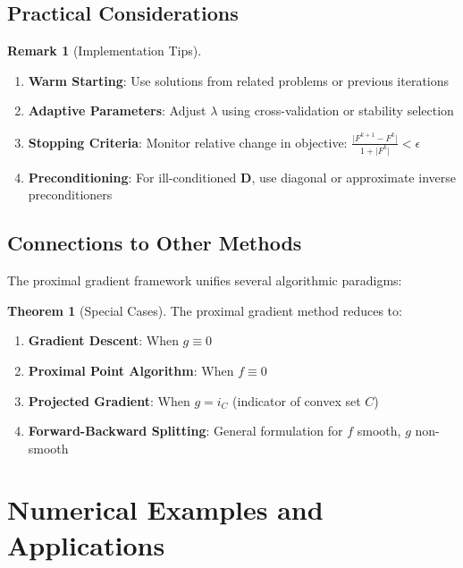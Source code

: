 \documentclass[12pt]{article}
\renewcommand{\vec}[1]{\mathbf{#1}}
\newcommand{\abs}[1]{\lvert #1 \rvert}
\theoremstyle{definition}
\newtheorem{theorem}{Theorem}[section]
\newtheorem{remark}{Remark}[section]
\begin{document}
\subsection{Practical Considerations}

\begin{remark}[Implementation Tips]
    \begin{enumerate}
        \item \textbf{Warm Starting}: Use solutions from related problems or previous iterations
        \item \textbf{Adaptive Parameters}: Adjust $\lambda$ using cross-validation or stability selection
        \item \textbf{Stopping Criteria}: Monitor relative change in objective: $\frac{\abs{F^{k+1} - F^k}}{1 + \abs{F^k}} < \epsilon$
        \item \textbf{Preconditioning}: For ill-conditioned $\vec{D}$, use diagonal or approximate inverse preconditioners
    \end{enumerate}
\end{remark}

\subsection{Connections to Other Methods}

The proximal gradient framework unifies several algorithmic paradigms:

\begin{theorem}[Special Cases]
    The proximal gradient method reduces to:
    \begin{enumerate}
        \item \textbf{Gradient Descent}: When $g \equiv 0$
        \item \textbf{Proximal Point Algorithm}: When $f \equiv 0$
        \item \textbf{Projected Gradient}: When $g = i_C$ (indicator of convex set $C$)
        \item \textbf{Forward-Backward Splitting}: General formulation for $f$ smooth, $g$ non-smooth
    \end{enumerate}
\end{theorem}

\newpage
\section{Numerical Examples and Applications}
\end{document}
